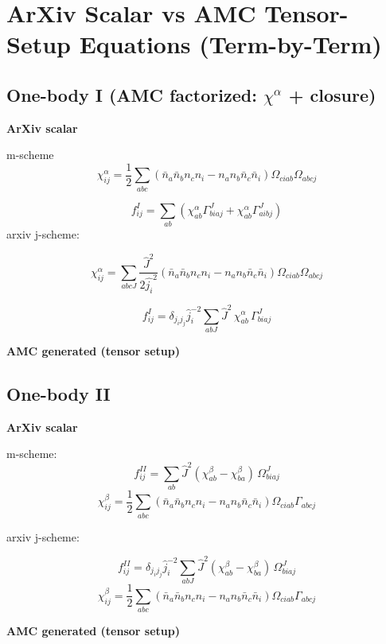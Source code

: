 \documentclass[11pt]{article}
\newcommand{\CompareBlock}[3]{%
\subsection*{#1}
\noindent
\begin{minipage}[t]{0.48\textwidth}
\textbf{ArXiv scalar}
#2
\end{minipage}\hfill
\begin{minipage}[t]{0.48\textwidth}
\textbf{AMC generated (tensor setup)}

\end{minipage}
\vspace{1em}
}
\begin{document}
\small

\section*{ArXiv Scalar vs AMC Tensor-Setup Equations (Term-by-Term)}


\CompareBlock{One-body I (AMC factorized: $\chi^{\alpha}$ + closure)}{


m-scheme
\begin{equation*}
 \chi^{\alpha}_{ij}=\frac12\sum_{abc}\left(\bar n_a\bar n_b n_c n_i-n_a n_b\bar n_c\bar n_i\right)\Omega_{ciab}\Omega_{abcj}
\end{equation*}

\begin{equation*}
 f^{I}_{ij}=\sum_{ab}(\chi^{\alpha}_{ab}\Gamma^J_{biaj}+\chi^{\alpha}_{ab}\Gamma^J_{aibj})
\end{equation*}
arxiv j-scheme:

\begin{equation*}
 \chi^{\alpha}_{ij}=\sum_{abcJ}\frac{\hat{J}^2}{2\hat{j_i}^2}\left(\bar n_a\bar n_b n_c n_i-n_a n_b\bar n_c\bar n_i\right)\Omega_{ciab}\Omega_{abcj}
\end{equation*}

\begin{equation*}
 f^{I}_{ij}=\delta_{j_i j_j}\hat j_i^{-2}\sum_{abJ}\hat J^2\,\chi^{\alpha}_{ab}\,\Gamma^J_{biaj}
\end{equation*}

}{amc_eq_snippets_clean/dc_f1_tensor_clean_body.tex}

\CompareBlock{One-body II}{


m-scheme:
\begin{equation*}
 f^{II}_{ij}=\sum_{ab}\hat J^2(\chi^{\beta}_{ab}-\chi^{\beta}_{ba})\,\Omega^J_{biaj}
\end{equation*}
\begin{equation*}
 \chi^{\beta}_{ij}=\frac12\sum_{abc}\left(\bar n_a\bar n_b n_c n_i-n_a n_b\bar n_c\bar n_i\right)\Omega_{ciab}\Gamma_{abcj}
\end{equation*}

arxiv j-scheme:

\begin{equation*}
 f^{II}_{ij}=\delta_{j_i j_j}\hat j_i^{-2}\sum_{abJ}\hat J^2(\chi^{\beta}_{ab}-\chi^{\beta}_{ba})\,\Omega^J_{biaj}
\end{equation*}
\begin{equation*}
 \chi^{\beta}_{ij}=\frac12\sum_{abc}\left(\bar n_a\bar n_b n_c n_i-n_a n_b\bar n_c\bar n_i\right)\Omega_{ciab}\Gamma_{abcj}
\end{equation*}
}{amc_eq_snippets_clean/dc_f2_chibeta_tensor_only_body.tex}
\end{document}
